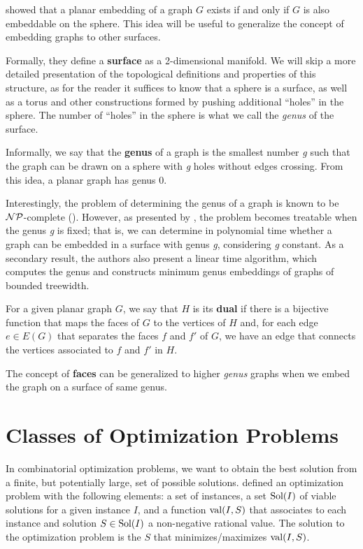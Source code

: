 \cite{BondyNMurty} showed that a planar embedding of a graph \(G\) exists if and only if \(G\) is also embeddable on the sphere. This idea will be useful to generalize the concept of embedding graphs to other surfaces.

Formally, they define a \textbf{surface} as a 2-dimensional manifold. We will skip a more detailed presentation of the topological definitions and properties of this structure, as for the reader it suffices to know that a sphere is a surface, as well as a torus and other constructions formed by pushing additional ``holes'' in the sphere. The number of ``holes'' in the sphere is what we call the \textit{genus} of the surface.

Informally, we say that the \textbf{genus} of a graph is the smallest number \textit{g} such that the graph can be drawn on a sphere with \textit{g} holes without edges crossing. From this idea, a planar graph has genus 0.

Interestingly, the problem of determining the genus of a graph is known to be \(\mathcal{NP}\)-complete (\cite{THOMASSEN1989568}). However, as presented by \cite{LinearGenus}, the problem becomes treatable when the genus \textit{g} is fixed; that is, we can determine in polynomial time whether a graph can be embedded in a surface with genus \textit{g}, considering \textit{g} constant. As a secondary result, the authors also present a linear time algorithm, which computes the genus and constructs minimum genus embeddings of graphs of bounded treewidth. 

For a given planar graph \(G\), we say that \(H\) is its \textbf{dual} if there is a bijective function that maps the faces of \(G\) to the vertices of \(H\) and, for each edge \(e \in E(G)\) that separates the faces \(f\) and \(f'\) of \(G\), we have an edge that connects the vertices associated to \(f\) and \(f'\) in \(H\).

The concept of \textbf{faces} can be generalized to higher \textit{genus} graphs when we embed the graph on a surface of same genus.

\section{Classes of Optimization Problems}

In combinatorial optimization problems, we want to obtain the best solution from a finite, but potentially large, set of possible solutions. \cite{livroAprox} defined an optimization problem with the following elements: a set of instances, a set \(\operatorname{\textrm{Sol}}(I)\) of viable solutions for a given instance \(I\), and a function \(\operatorname{\textrm{val}} (I, S)\) that associates to each instance and solution \(S \in \operatorname{\textrm{Sol}}(I)\) a non-negative rational value. The solution to the optimization problem is the \(S\) that minimizes/maximizes \(\operatorname{\textrm{val}}(I, S)\).

